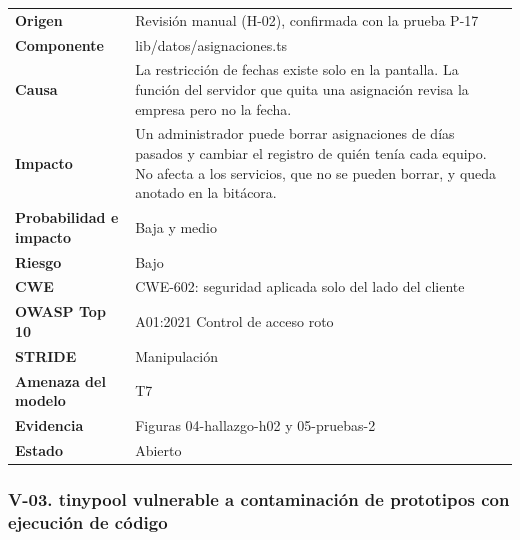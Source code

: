 \documentclass[12pt, letterpaper]{article}
\begin{document}
\begingroup\small\setlength{\tabcolsep}{4pt}\renewcommand{\arraystretch}{1.25}
\begin{longtable}{L{0.24}L{0.70}}
\toprule
\endfirsthead
\toprule
\endhead
\bottomrule
\endfoot
\textbf{Origen} & Revisión manual (H-02), confirmada con la prueba P-17 \\
\textbf{Componente} & lib/datos/asignaciones.ts \\
\textbf{Causa} & La restricción de fechas existe solo en la pantalla. La función del servidor que quita una asignación revisa la empresa pero no la fecha. \\
\textbf{Impacto} & Un administrador puede borrar asignaciones de días pasados y cambiar el registro de quién tenía cada equipo. No afecta a los servicios, que no se pueden borrar, y queda anotado en la bitácora. \\
\textbf{Probabilidad e impacto} & Baja y medio \\
\textbf{Riesgo} & Bajo \\
\textbf{CWE} & CWE-602: seguridad aplicada solo del lado del cliente \\
\textbf{OWASP Top 10} & A01:2021 Control de acceso roto \\
\textbf{STRIDE} & Manipulación \\
\textbf{Amenaza del modelo} & T7 \\
\textbf{Evidencia} & Figuras 04-hallazgo-h02 y 05-pruebas-2 \\
\textbf{Estado} & Abierto \\
\end{longtable}
\endgroup

\subsubsection*{V-03. tinypool vulnerable a contaminación de prototipos con ejecución de código}
\end{document}
